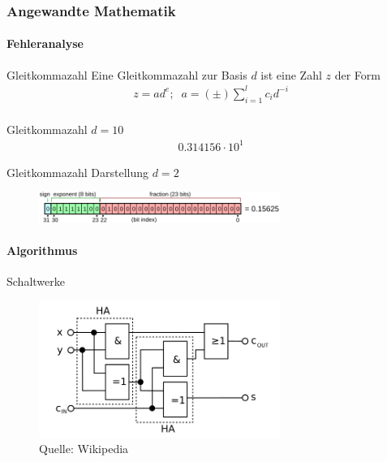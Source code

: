 \documentclass{beamer}
\begin{document}
\begin{frame}
    \frametitle{Angewandte Mathematik}
\framesubtitle{Fehleranalyse}
    \begin{block}{Gleitkommazahl}
Eine Gleitkommazahl zur Basis $d$ ist eine Zahl $z$ der Form
\begin{align*}
z = a d^e ; \;\;
a = (\pm) \sum_{i=1}^l c_i d^{-i} \\
\end{align*}
\end{block}

    \begin{block}{Gleitkommazahl $d=10$}
\begin{align*}
0.314156 \cdot 10^1
\end{align*}
\end{block}

\begin{block}{Gleitkommazahl Darstellung $d=2$}
\begin{figure}[H]
    \centering
  \includegraphics[width=0.7\textwidth]{images/float}\end{figure}
\end{block}

 \end{frame}

 \begin{frame}
    \framesubtitle{Algorithmus}
        \begin{block}{Schaltwerke}
    \begin{figure}[H]
          \centering
        \includegraphics[width=0.7\textwidth]{images/Volladdierer}
          \caption{Quelle: Wikipedia}
    \end{figure}
    \end{block}
    
     \end{frame}
    
\end{document}

